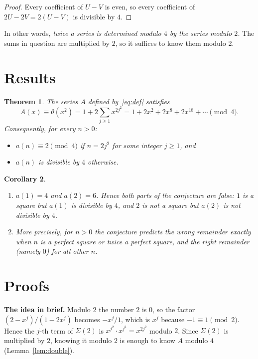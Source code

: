 \documentclass[11pt,a4paper]{article}
\newtheorem{theorem}{Theorem}[section]
\newtheorem{corollary}[theorem]{Corollary}
\theoremstyle{definition}
\theoremstyle{remark}
\newcommand{\para}[1]{\par\medskip\noindent\textbf{#1}\enspace}
\begin{document}
\begin{proof}
Every coefficient of $U-V$ is even, so every coefficient of $2U-2V=2(U-V)$ is divisible by $4$.
\end{proof}
In other words, \emph{twice a series is determined modulo $4$ by the series modulo $2$.} The sums in question are
multiplied by $2$, so it suffices to know them modulo $2$.

\section{Results}\label{sec:results}

\begin{theorem}\label{thm:main}
The series $A$ defined by~\eqref{eq:def} satisfies
\[
A(x)\equiv\theta(x^2)=1+2\sum_{j\ge1}x^{2j^2}=1+2x^2+2x^8+2x^{18}+\cdots\pmod4 .
\]
Consequently, for every $n>0$:
\begin{itemize}
\item $a(n)\equiv2\pmod 4$ if $n=2j^2$ for some integer $j\ge1$, and
\item $a(n)$ is divisible by $4$ otherwise.
\end{itemize}
\end{theorem}

\begin{corollary}\label{cor:false}
\begin{enumerate}[label=(\alph*)]
\item $a(1)=4$ and $a(2)=6$. Hence both parts of the conjecture are false: $1$ is a square but $a(1)$ is divisible by
$4$, and $2$ is not a square but $a(2)$ is not divisible by $4$.
\item More precisely, for $n>0$ the conjecture predicts the wrong remainder exactly when $n$ is a perfect square or
twice a perfect square, and the right remainder (namely $0$) for all other $n$.
\end{enumerate}
\end{corollary}

\section{Proofs}\label{sec:proofs}

\para{The idea in brief.} Modulo $2$ the number $2$ is $0$, so the factor $(2-x^j)/(1-2x^j)$ becomes $-x^j/1$, which is $x^j$ because
$-1\equiv1\pmod 2$. Hence the $j$-th term of $\Sigma(2)$ is $x^{j^2}\cdot x^{j^2}=x^{2j^2}$ modulo $2$. Since $\Sigma(2)$
is multiplied by $2$, knowing it modulo $2$ is enough to know $A$ modulo $4$ (Lemma~\ref{lem:double}).
\end{document}
